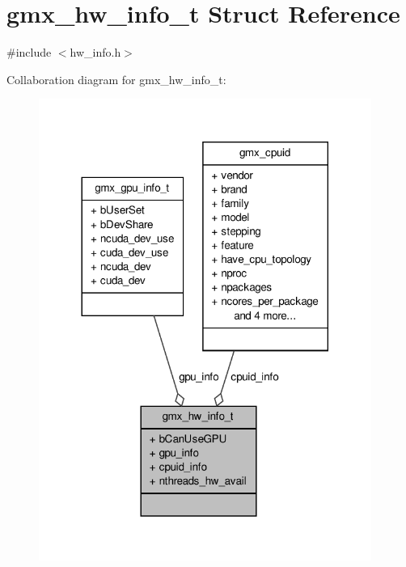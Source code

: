 \hypertarget{structgmx__hw__info__t}{\section{gmx\-\_\-hw\-\_\-info\-\_\-t \-Struct \-Reference}
\label{structgmx__hw__info__t}
}


{\ttfamily \#include $<$hw\-\_\-info.\-h$>$}



\-Collaboration diagram for gmx\-\_\-hw\-\_\-info\-\_\-t\-:
\nopagebreak
\begin{figure}[H]
\begin{center}
\leavevmode
\includegraphics[width=308pt]{structgmx__hw__info__t__coll__graph}
\end{center}
\end{figure}
